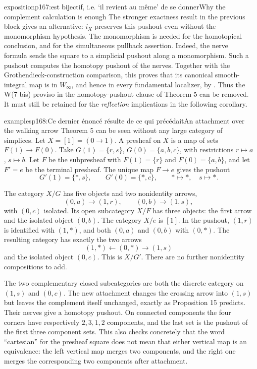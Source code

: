\begin{dcomment}{exposition}{p167:est bijectif, i.e. ‘il revient au même’ de se donner}{Why the complement calculation is enough}
The stronger exactness result in the previous block gives an alternative: $i_X$ preserves this pushout even without the monomorphism hypothesis. The monomorphism is needed for the homotopical conclusion, and for the simultaneous pullback assertion. Indeed, the nerve formula sends the square to a simplicial pushout along a monomorphism. Such a pushout computes the homotopy pushout of the nerves. Together with the Grothendieck-construction comparison, this proves that its canonical smooth-integral map is in $W_\infty$, and hence in every fundamental localizer, by \citet[Corollary 4.2.19]{Cisinski2006}. Thus the W(7 bis) proviso in the homotopy-pushout clause of Theorem 5 can be removed. It must still be retained for the \emph{reflection} implications in the following corollary.
\end{dcomment}

\begin{dcomment}{examples}{p168:Ce dernier énoncé résulte de ce qui précédait}{An attachment over the walking arrow}
Theorem 5 can be seen without any large category of simplices. Let $X=[1]=(0\to1)$. A presheaf on $X$ is a map of sets $F(1)\to F(0)$. Take $G(1)=\{r,s\}$, $G(0)=\{a,b,c\}$, with restrictions $r\mapsto a$, $s\mapsto b$. Let $F$ be the subpresheaf with $F(1)=\{r\}$ and $F(0)=\{a,b\}$, and let $F'=e$ be the terminal presheaf. The unique map $F\to e$ gives the pushout
\[
 G'(1)=\{*,s\},\qquad G'(0)=\{*,c\},
 \qquad *\mapsto*,\quad s\mapsto*.
\]

The category $X/G$ has five objects and two nonidentity arrows,
\[
 (0,a)\longrightarrow(1,r),\qquad
 (0,b)\longrightarrow(1,s),
\]
with $(0,c)$ isolated. Its open subcategory $X/F$ has three objects: the first arrow and the isolated object $(0,b)$. The category $X/e$ is $[1]$. In the pushout, $(1,r)$ is identified with $(1,*)$, and both $(0,a)$ and $(0,b)$ with $(0,*)$. The resulting category has exactly the two arrows
\[
 (1,*)\longleftarrow(0,*)\longrightarrow(1,s)
\]
and the isolated object $(0,c)$. This is $X/G'$. There are no further nonidentity compositions to add.

The two complementary closed subcategories are both the discrete category on $(1,s)$ and $(0,c)$. The new attachment changes the crossing arrow into $(1,s)$ but leaves the complement itself unchanged, exactly as Proposition 15 predicts. Their nerves give a homotopy pushout. On connected components the four corners have respectively $2,3,1,2$ components, and the last set is the pushout of the first three component sets. This also checks concretely that the word ``cartesian'' for the presheaf square does not mean that either vertical map is an equivalence: the left vertical map merges two components, and the right one merges the corresponding two components after attachment.
\end{dcomment}

